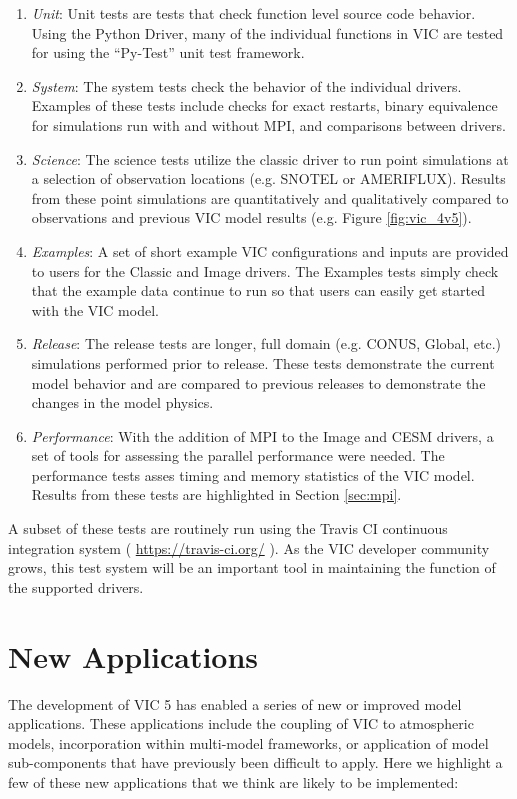 \documentclass[gmd, manuscript]{copernicus}
\begin{document}
    \begin{enumerate}
      \item \textit{Unit}: Unit tests are tests that check function level source code behavior.
      Using the Python Driver, many of the individual functions in VIC are tested for using the ``Py-Test'' unit test framework.
      \item \textit{System}: The system tests check the behavior of the individual drivers.
      Examples of these tests include checks for exact restarts, binary equivalence for simulations run with and without MPI, and comparisons between drivers.
      \item \textit{Science}: The science tests utilize the classic driver to run point simulations at a selection of observation locations (e.g. SNOTEL or AMERIFLUX).
      Results from these point simulations are quantitatively and qualitatively compared to observations and previous VIC model results (e.g. Figure \ref{fig:vic_4v5}).
      \item \textit{Examples}: A set of short example VIC configurations and inputs are provided to users for the Classic and Image drivers.
      The Examples tests simply check that the example data continue to run so that users can easily get started with the VIC model.
      \item \textit{Release}: The release tests are longer, full domain (e.g. CONUS, Global, etc.) simulations performed prior to release.
      These tests demonstrate the current model behavior and are compared to previous releases to demonstrate the changes in the model physics.
      \item \textit{Performance}: With the addition of MPI to the Image and CESM drivers, a set of tools for assessing the parallel performance were needed.
      The performance tests asses timing and memory statistics of the VIC model.
      Results from these tests are highlighted in Section \ref{sec:mpi}.
    \end{enumerate}

    A subset of these tests are routinely run using the Travis CI continuous integration system ( \url{https://travis-ci.org/} ).
    As the VIC developer community grows, this test system will be an important tool in maintaining the function of the supported drivers.

\section{New Applications}
  \label{sec:new_apps}
  The development of VIC 5 has enabled a series of new or improved model applications.
  These applications include the coupling of VIC to atmospheric models, incorporation within multi-model frameworks, or application of model sub-components that have previously been difficult to apply.
  Here we highlight a few of these new applications that we think are likely to be implemented:
\end{document}
